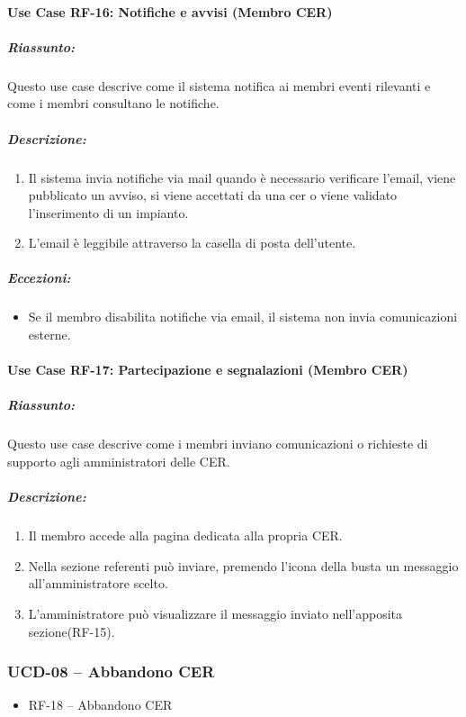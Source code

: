 \paragraph*{Use Case RF-16: Notifiche e avvisi (Membro CER)}
\subparagraph*{Riassunto:}
Questo use case descrive come il sistema notifica ai membri eventi rilevanti e come i membri consultano le notifiche.

\subparagraph*{Descrizione:}
\begin{enumerate}
    \item Il sistema invia notifiche via mail quando è necessario verificare l'email, viene pubblicato un avviso, si viene accettati da una cer o viene validato l'inserimento di un impianto.
    \item L'email è leggibile attraverso la casella di posta dell'utente.
\end{enumerate}

\subparagraph*{Eccezioni:}
\begin{itemize}
    \item Se il membro disabilita notifiche via email, il sistema non invia comunicazioni esterne.
\end{itemize}

\paragraph*{Use Case RF-17: Partecipazione e segnalazioni (Membro CER)}
\subparagraph*{Riassunto:}
Questo use case descrive come i membri inviano comunicazioni o richieste di supporto agli amministratori delle CER.

\subparagraph*{Descrizione:}
\begin{enumerate}
    \item Il membro accede alla pagina dedicata alla propria CER.
    \item Nella sezione referenti può inviare, premendo l'icona della busta un messaggio all'amministratore scelto.
    \item L'amministratore può visualizzare il messaggio inviato nell'apposita sezione(RF-15).
\end{enumerate}

\subsubsection*{UCD-08 – Abbandono CER}
\begin{itemize}
    \item RF-18 – Abbandono CER
\end{itemize}

